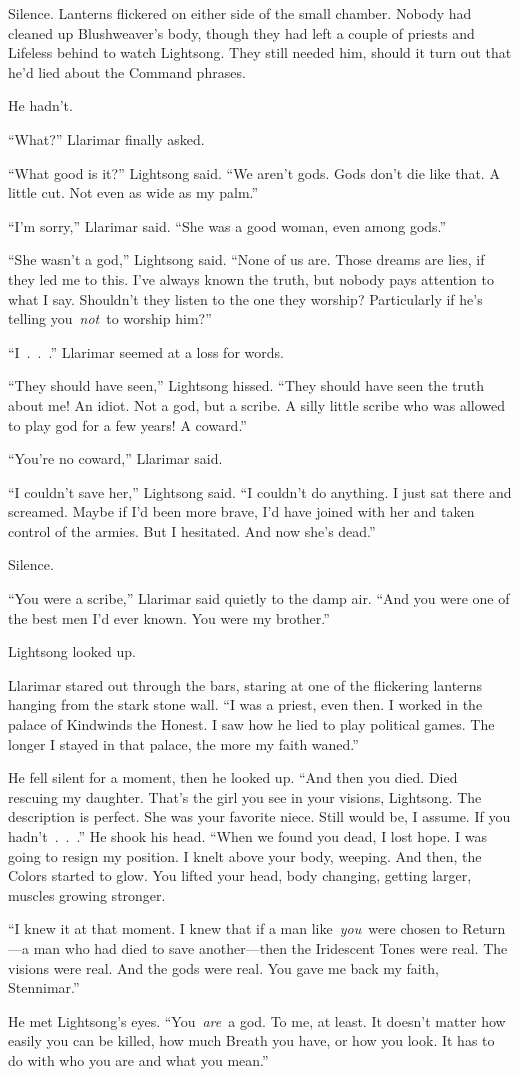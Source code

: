 Silence. Lanterns flickered on either side of the small chamber. Nobody had cleaned up Blushweaver’s body, though they had left a couple of priests and Lifeless behind to watch Lightsong. They still needed him, should it turn out that he’d lied about the Command phrases.

He hadn’t.

“What?” Llarimar finally asked.

“What good is it?” Lightsong said. “We aren’t gods. Gods don’t die like that. A little cut. Not even as wide as my palm.”

“I’m sorry,” Llarimar said. “She was a good woman, even among gods.”

“She wasn’t a god,” Lightsong said. “None of us are. Those dreams are lies, if they led me to this. I’ve always known the truth, but nobody pays attention to what I say. Shouldn’t they listen to the one they worship? Particularly if he’s telling you~\textit{not}~to worship him?”

“I~.~.~.” Llarimar seemed at a loss for words.

“They should have seen,” Lightsong hissed. “They should have seen the truth about me! An idiot. Not a god, but a scribe. A silly little scribe who was allowed to play god for a few years! A coward.”

“You’re no coward,” Llarimar said.

“I couldn’t save her,” Lightsong said. “I couldn’t do anything. I just sat there and screamed. Maybe if I’d been more brave, I’d have joined with her and taken control of the armies. But I hesitated. And now she’s dead.”

Silence.

“You were a scribe,” Llarimar said quietly to the damp air. “And you were one of the best men I’d ever known. You were my brother.”

Lightsong looked up.

Llarimar stared out through the bars, staring at one of the flickering lanterns hanging from the stark stone wall. “I was a priest, even then. I worked in the palace of Kindwinds the Honest. I saw how he lied to play political games. The longer I stayed in that palace, the more my faith waned.”

He fell silent for a moment, then he looked up. “And then you died. Died rescuing my daughter. That’s the girl you see in your visions, Lightsong. The description is perfect. She was your favorite niece. Still would be, I assume. If you hadn’t~.~.~.” He shook his head. “When we found you dead, I lost hope. I was going to resign my position. I knelt above your body, weeping. And then, the Colors started to glow. You lifted your head, body changing, getting larger, muscles growing stronger.

“I knew it at that moment. I knew that if a man like~\textit{you}~were chosen to Return—a man who had died to save another—then the Iridescent Tones were real. The visions were real. And the gods were real. You gave me back my faith, Stennimar.”

He met Lightsong’s eyes. “You~\textit{are}~a god. To me, at least. It doesn’t matter how easily you can be killed, how much Breath you have, or how you look. It has to do with who you are and what you mean.”


